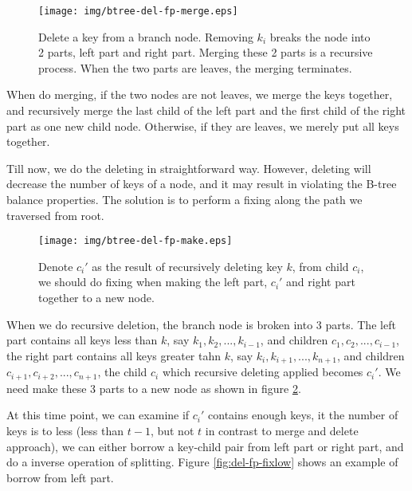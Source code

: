 \documentclass{article}
\begin{document}
\begin{figure}[htbp]
    \begin{center}
      \texttt{[image: img/btree-del-fp-merge.eps]}
      \caption{Delete a key from a branch node. Removing $k_i$ breaks
the node into 2 parts, left part and right part. Merging these 2 parts
is a recursive process. When the two parts are leaves, the merging
terminates.} \label{fig:del-fp-merge}
    \end{center}
\end{figure}

When do merging, if the two nodes are not leaves, we merge the keys
together, and recursively merge the last child of the left part
and the first child of the right part as one new child node. Otherwise,
if they are leaves, we merely put all keys together.

Till now, we do the deleting in straightforward way. However, deleting
will decrease the number of keys of a node, and it may result in 
violating the B-tree balance properties. The solution is to perform a 
fixing along the path we traversed from root.

\begin{figure}[htbp]
    \begin{center}
      \texttt{[image: img/btree-del-fp-make.eps]}
      \caption{Denote $c_i'$ as the result of recursively deleting 
key $k$, from child $c_i$, we should do fixing when making the 
left part, $c_i'$ and right part together to a new node.} \label{fig:del-fp-make}
    \end{center}
\end{figure}

When we do recursive deletion, the branch node is broken into 3 parts.
The left part contains all keys less than $k$, say $k_1, k_2, ..., k_{i-1}$,
and children $c_1, c_2, ..., c_{i-1}$, the right part contains all keys
greater tahn $k$, say $k_i, k_{i+1}, ..., k_{n+1}$, and children
$c_{i+1}, c_{i+2}, ..., c_{n+1}$, the child $c_i$ which recursive deleting
applied becomes $c_i'$. We need make these 3 parts to a new node
as shown in figure \ref{fig:del-fp-make}.

At this time point, we can examine if $c_i'$ contains enough keys,
it the number of keys is to less (less than $t-1$, but not $t$ in 
contrast to merge and delete approach), we can either borrow a key-child
pair from left part or right part, and do a inverse operation of
splitting. Figure \ref{fig:del-fp-fixlow} shows an example of borrow from left part.
\end{document}
